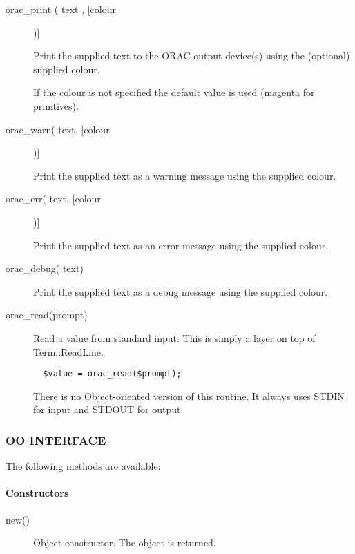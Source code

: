 \begin{description}
\item[orac\_print ( text , [colour])] \mbox{}

Print the supplied text to the ORAC output device(s)
using the (optional) supplied colour.



If the colour is not specified the default value is used (magenta
for primtives).

\item[orac\_warn( text, [colour])] \mbox{}

Print the supplied text as a warning message using the supplied
colour.

\item[orac\_err( text, [colour])] \mbox{}

Print the supplied text as an error message using the supplied
colour.

\item[orac\_debug( text)] \mbox{}

Print the supplied text as a debug message using the supplied
colour.

\item[orac\_read(prompt)] \mbox{}

Read a value from standard input. This is simply a layer
on top of Term::ReadLine.

\begin{verbatim}
  $value = orac_read($prompt);
\end{verbatim}


There is no Object-oriented version of this routine. It always
uses STDIN for input and STDOUT for output.

\end{description}
\subsubsection*{OO INTERFACE\label{ORAC::Print_OO_INTERFACE}}

The following methods are available:

\paragraph*{Constructors\label{ORAC::Print_Constructors}}\begin{description}
\item[new()] \mbox{}

Object constructor. The object is returned.

\end{description}
